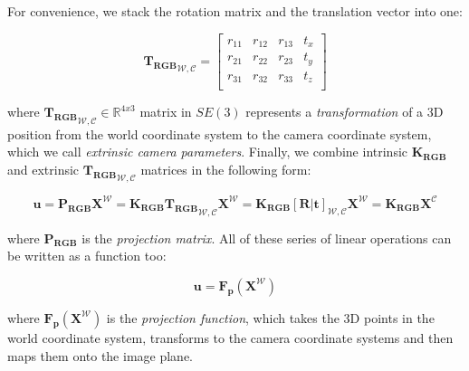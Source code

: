 \documentclass[12pt]{report}
\numberwithin{figure}{section}
\newcommand{\R}{\mathbb{R}}
\begin{document}
For convenience, we stack the rotation matrix and the translation vector into 
one:

\begin{equation}
  {\mathbf{T_{RGB}}}_{\mathcal{W}, \mathcal{C}} =
  \begin{bmatrix}
    r_{11} & r_{12} & r_{13} & t_x\\
    r_{21} & r_{22} & r_{23} & t_y\\
    r_{31} & r_{32} & r_{33} & t_z\\
  \end{bmatrix}\label{eq:transformation_matrix}
\end{equation} 

where ${\mathbf{T_{RGB}}}_{\mathcal{W}, \mathcal{C}} \in \R^{4x3}$ matrix 
in $SE(3)$ represents a 
\textit{transformation} of a 3D position from the world coordinate system to 
the 
camera coordinate system, which we call \textit{extrinsic camera parameters}.  
Finally, we combine intrinsic $\mathbf{K_{RGB}}$ and extrinsic 
${\mathbf{T_{RGB}}}_{\mathcal{W}, \mathcal{C}}$ matrices in the following form:

\begin{equation}\label{eq:simplyfied_proj_func_1}
  \mathbf{u} = 
  \mathbf{P_{RGB}}\mathbf{X^{\mathcal{W}}} = 
  \mathbf{K_{RGB}}{\mathbf{T_{RGB}}}_{\mathcal{W}, 
  \mathcal{C}}\mathbf{X^{\mathcal{W}}} 
  = 
  \mathbf{K_{RGB}}[\mathbf{R}|\mathbf{t}]_{\mathcal{W}, 
  \mathcal{C}} \mathbf{X^{\mathcal{W}}} =
  \mathbf{K_{RGB}}\mathbf{X^{\mathcal{C}}}
\end{equation} 

where $\mathbf{P_{RGB}}$ is the \textit{projection matrix}. All of these 
series of linear operations can be written as a function too:

\begin{equation}\label{eq:simplyfied_proj_func_2}
  \mathbf{u} = \mathbf{F_{p}}(\mathbf{X^{\mathcal{W}}})
\end{equation} 

where $\mathbf{F_{p}}(\mathbf{X^{\mathcal{W}}})$ is the \textit{projection 
function}, 
which takes the 3D points in the world coordinate system, transforms to the 
camera coordinate systems and then maps them onto the image plane.
\end{document}
